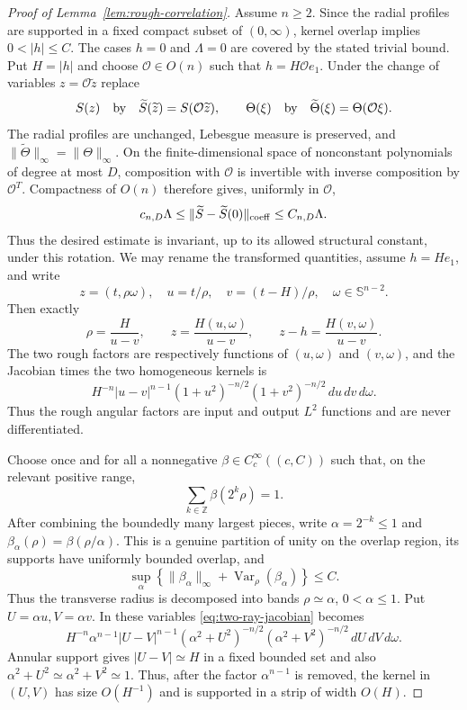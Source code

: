 \documentclass[11pt]{article}
\numberwithin{equation}{section}
\theoremstyle{remark}
\theoremstyle{definition}
\newcommand{\Sph}{\mathbb S}
\newcommand{\Var}{\operatorname{Var}}
\newcommand{\norm}[1]{\lVert #1\rVert}
\begin{document}
\begin{proof}[Proof of Lemma~\ref{lem:rough-correlation}]
Assume $n\ge2$.  Since the radial profiles are supported in a fixed
compact subset of $(0,\infty)$, kernel overlap implies $0<|h|\le C$.
The cases $h=0$ and $\Lambda=0$ are covered by the stated trivial bound.
Put $H=|h|$ and choose $\mathcal O\in O(n)$ such that
$h=H\mathcal Oe_1$.  Under the change of variables
$z=\mathcal O\widetilde z$ replace
\[
 S(z)\quad\hbox{by}\quad
 \widetilde S(\widetilde z)=S(\mathcal O\widetilde z),
 \qquad
 \Theta(\xi)\quad\hbox{by}\quad
 \widetilde\Theta(\xi)=\Theta(\mathcal O\xi).
\]
The radial profiles are unchanged, Lebesgue measure is preserved, and
$\norm{\widetilde\Theta}_\infty=\norm\Theta_\infty$.  On the
finite-dimensional space of nonconstant polynomials of degree at most $D$,
composition with $\mathcal O$ is invertible with inverse composition by
$\mathcal O^T$.  Compactness of $O(n)$ therefore gives, uniformly in
$\mathcal O$,
\[
 c_{n,D}\Lambda\le
 \norm{\widetilde S-\widetilde S(0)}_{\rm coeff}
 \le C_{n,D}\Lambda.
\]
Thus the desired estimate is invariant, up to its allowed structural
constant, under this rotation.  We may rename the transformed quantities,
assume $h=He_1$, and write
\[
 z=(t,\rho\omega),\quad u=t/\rho,\quad v=(t-H)/\rho,
 \quad\omega\in\Sph^{n-2}.
\]
Then exactly
\begin{equation}\label{eq:two-ray-coordinates}
 \rho=\frac{H}{u-v},\qquad
 z=\frac{H(u,\omega)}{u-v},\qquad
 z-h=\frac{H(v,\omega)}{u-v}.
\end{equation}
The two rough factors are respectively functions of $(u,\omega)$ and
$(v,\omega)$, and the Jacobian times the two homogeneous kernels is
\begin{equation}\label{eq:two-ray-jacobian}
 H^{-n}|u-v|^{n-1}(1+u^2)^{-n/2}(1+v^2)^{-n/2}
 \,du\,dv\,d\omega.
\end{equation}
Thus the rough angular factors are input and output $L^2$ functions and
are never differentiated.

Choose once and for all a nonnegative
$\beta\in C_c^\infty((c,C))$ such that, on the relevant positive range,
\[
 \sum_{k\in\mathbb Z}\beta(2^k\rho)=1.
\]
After combining the boundedly many largest pieces, write
$\alpha=2^{-k}\le1$ and
$\beta_\alpha(\rho)=\beta(\rho/\alpha)$.  This is a genuine partition of
unity on the overlap region, its supports have uniformly bounded overlap,
and
\begin{equation}\label{eq:rough-polar-partition-bv}
 \sup_\alpha\left\{\norm{\beta_\alpha}_\infty+
  \Var_\rho(\beta_\alpha)\right\}\le C.
\end{equation}
Thus the transverse radius is decomposed into bands
$\rho\simeq\alpha$, $0<\alpha\le1$.  Put $U=\alpha u,V=\alpha v$.
In these variables \eqref{eq:two-ray-jacobian} becomes
\begin{equation}\label{eq:two-ray-scaled-jacobian}
 H^{-n}\alpha^{n-1}|U-V|^{n-1}
 (\alpha^2+U^2)^{-n/2}(\alpha^2+V^2)^{-n/2}
 \,dU\,dV\,d\omega.
\end{equation}
Annular support gives $|U-V|\simeq H$ in a fixed bounded set and also
$\alpha^2+U^2\simeq\alpha^2+V^2\simeq1$.  Thus, after the factor
$\alpha^{n-1}$ is removed, the kernel in $(U,V)$ has size $O(H^{-1})$
and is supported in a strip of width $O(H)$.


\end{proof}
\end{document}
